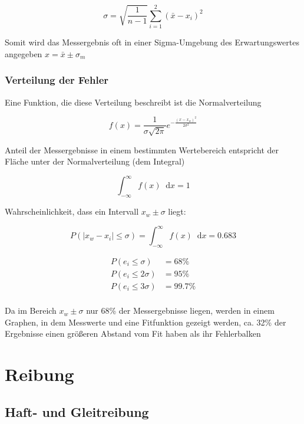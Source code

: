 \documentclass[a4paper,12pt]{report}
\newcommand*\diff{\mathop{}\!\mathrm{d}}
\begin{document}
\begin{equation}
\sigma = \sqrt{\frac{1}{n-1}} \sum_{i = 1}^2 (\bar{x} - x_i)^2
\end{equation}

Somit wird das Messergebnis oft in einer Sigma-Umgebung des Erwartungswertes angegeben $x = \bar{x} \pm \sigma_m $ \\

\subsubsection{Verteilung der Fehler}

Eine Funktion, die diese Verteilung beschreibt ist die Normalverteilung

\begin{equation}
f(x) = \frac{1}{\sigma \sqrt{2 \pi} } e^{-\frac{(x-x_w)^2}{2\sigma^2}}
\end{equation}

Anteil der Messergebnisse in einem bestimmten Wertebereich entspricht der Fläche unter der Normalverteilung (dem Integral)

\begin{equation}
\int_{-\infty}^\infty f(x) \diff x = 1
\end{equation}

Wahrscheinlichkeit, dass ein Intervall $x_w \pm \sigma $ liegt:

\begin{equation}
P(|x_w - x_i | \le \sigma) = \int_{-\infty}^\infty f(x) \diff x = 0.683 
\end{equation}

\begin{align*}
P(e_i \le \sigma) &= 68\% \\
P(e_i \le 2\sigma) &= 95\% \\
P(e_i \le 3\sigma) &= 99.7\% \\
\end{align*}

Da im Bereich $x_w\pm \sigma $ nur 68\% der Messergebnisse liegen, werden in einem Graphen, in dem Messwerte und eine Fitfunktion gezeigt werden, ca. 32\% der Ergebnisse einen größeren Abstand vom Fit haben als ihr Fehlerbalken


\section{Reibung}


\subsection{Haft- und Gleitreibung}
\end{document}
